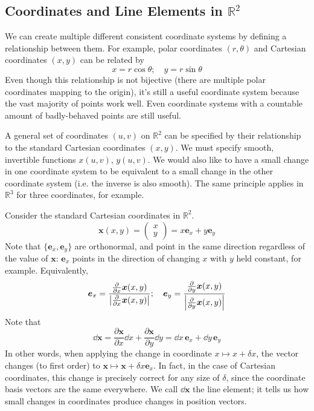 \documentclass{article}
\begin{document}
\subsection{Coordinates and Line Elements in $\mathbb R^2$}
We can create multiple different consistent coordinate systems by defining a relationship between them. For example, polar coordinates $(r, \theta)$ and Cartesian coordinates $(x, y)$ can be related by
\[ x = r \cos \theta;\quad y = r \sin \theta \]
Even though this relationship is not bijective (there are multiple polar coordinates mapping to the origin), it's still a useful coordinate system because the vast majority of points work well. Even coordinate systems with a countable amount of badly-behaved points are still useful.

A general set of coordinates $(u, v)$ on $\mathbb R^2$ can be specified by their relationship to the standard Cartesian coordinates $(x, y)$. We must specify smooth, invertible functions $x(u, v)$, $y(u, v)$. We would also like to have a small change in one coordinate system to be equivalent to a small change in the other coordinate system (i.e. the inverse is also smooth). The same principle applies in $\mathbb R^3$ for three coordinates, for example.

Consider the standard Cartesian coordinates in $\mathbb R^2$.
\[ \bm x(x, y) = \begin{pmatrix}
        x \\ y
    \end{pmatrix} = x \bm e_x + y \bm e_y \]
Note that $\{\bm e_x, \bm e_y\}$ are orthonormal, and point in the same direction regardless of the value of $\bm x$: $\bm e_x$ points in the direction of changing $x$ with $y$ held constant, for example. Equivalently,
\[ \bm e_x = \frac{\frac{\partial}{\partial x} \bm x(x, y)}{\abs{\frac{\partial}{\partial x} \bm x(x, y)}};\quad \bm e_y = \frac{\frac{\partial}{\partial y} \bm x(x, y)}{\abs{\frac{\partial}{\partial y} \bm x(x, y)}} \]
Note that
\[ \dd \bm x = \frac{\partial \bm x}{\partial x}\dd x + \frac{\partial \bm x}{\partial y} \dd y = \dd x \,\bm e_x + \dd y \,\bm e_y \]
In other words, when applying the change in coordinate $x \mapsto x + \delta x$, the vector changes (to first order) to $\bm x \mapsto \bm x + \delta x \bm e_x$. In fact, in the case of Cartesian coordinates, this change is precisely correct for any size of $\delta$, since the coordinate basis vectors are the same everywhere. We call $\dd \bm x$ the line element; it tells us how small changes in coordinates produce changes in position vectors.
\end{document}
